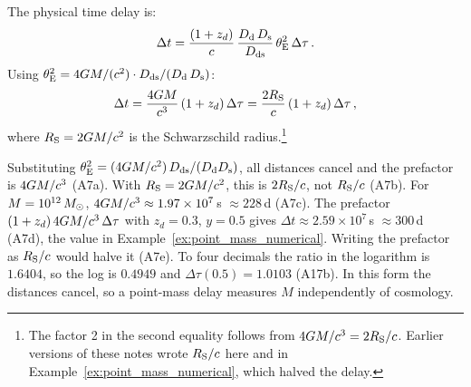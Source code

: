 The physical time delay is:
\begin{equation}
    \Delta t = \frac{(1 + z_d)}{c}\,
    \frac{D_{\mathrm{d}}\,D_{\mathrm{s}}}{D_{\mathrm{ds}}}\, \theta_{\mathrm{E}}^2\, \Delta\tau \,.
    \label{eq:delta_t_point_mass}
\end{equation}
Using $\theta_{\mathrm{E}}^2 = 4G M / (c^2) \cdot D_{\mathrm{ds}} / (D_{\mathrm{d}}\,D_{\mathrm{s}})$:
\begin{equation}
    \Delta t = \frac{4G M}{c^3}\, (1 + z_d)\, \Delta\tau
    = \frac{2R_{\mathrm{S}}}{c}\, (1 + z_d)\, \Delta\tau \,,
    \label{eq:delta_t_schwarzschild}
\end{equation}
where $R_{\mathrm{S}} = 2G M / c^2$ is the Schwarzschild
radius.\footnote{The factor 2 in the second equality follows from
$4\Gnewton M/\speedoflight^3 = 2\RS/\speedoflight$.  Earlier versions of these
notes wrote $R_{\mathrm{S}}/c$ here and in
Example~\ref{ex:point_mass_numerical}, which halved the delay.}

\begin{annotation}[Unit check: $4\Gnewton M/\speedoflight^3 = 2\RS/\speedoflight$]
Substituting $\theta_{\mathrm{E}}^2 = (4G M/c^2)\,D_{\mathrm{ds}}/(D_{\mathrm{d}}D_{\mathrm{s}})$, all distances
cancel and the prefactor is $4G M/c^3$ (A7a).  With
$R_{\mathrm{S}} = 2G M/c^2$, this is $2R_{\mathrm{S}}/c$, not $R_{\mathrm{S}}/c$ (A7b).
For $M=10^{12}\,M_{\odot}$, $4G M/c^3\approx1.97\times10^7$\,s
$\approx228$\,d (A7c).  The prefactor $(1+z_d)\,4G M/c^3\,\Delta\tau$
with $z_d=0.3$, $y=0.5$ gives $\Delta t\approx2.59\times10^7$\,s $\approx300$\,d
(A7d), the value in Example~\ref{ex:point_mass_numerical}.  Writing the prefactor
as $R_{\mathrm{S}}/c$ would halve it (A7e).  To four decimals the ratio in the
logarithm is $1.6404$, so the log is $0.4949$ and $\Delta\tau(0.5)=1.0103$ (A17b).
In this form the distances cancel, so a point-mass delay measures $M$
independently of cosmology.
\end{annotation}

